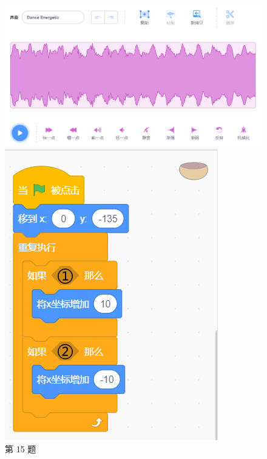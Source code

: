 \documentclass[10pt, a4paper]{article}
\begin{document}
\begin{enumerate}
        \begin{figure}[htbp]
            \centering
            \begin{minipage}[t]{.45\textwidth}
                \centering
                \includegraphics[width=\textwidth]{15.png}
                \caption*{第 15 题}
            \end{minipage}
            \begin{minipage}[t]{.5\textwidth}
                \centering
                \begin{minipage}[t]{.35\textwidth}
                    \centering
                    \includegraphics[width=\textwidth]{16-1.png}

\end{minipage}
\end{minipage}
\end{figure}
\end{enumerate}
\end{document}
